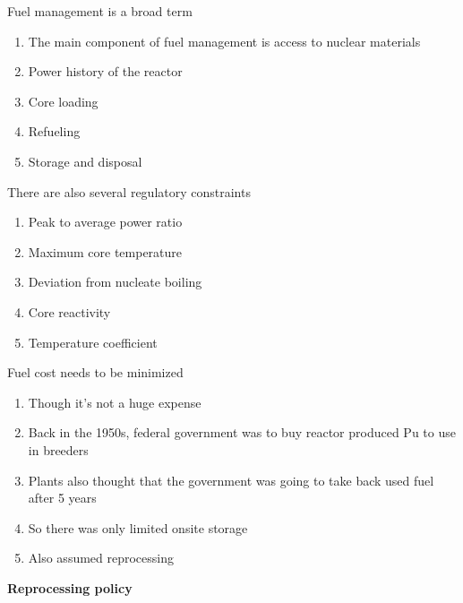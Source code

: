 \documentclass[aspectratio=1610,pdftex,dvipsnames,compress,xcolor={dvipsnames}]{beamer}
\begin{document}
\addtocounter{framenumber}{-1} 
\begin{frame}{Fuel management is a broad term}
    \begin{enumerate}[series=outerlist,topsep=0pt,itemsep=15pt,leftmargin=*,label=(\arabic*)]
        \item[]The main component of fuel management is access to nuclear materials
        \item[]Power history of the reactor
        \item[]Core loading
        \item[]Refueling
        \item[]Storage and disposal
    \end{enumerate}
\end{frame}


\begin{frame}{There are also several regulatory constraints}
    \begin{enumerate}[topsep=0pt,itemsep=21pt,leftmargin=*,label=(\arabic*)]
        \item[]Peak to average power ratio
        \item[]Maximum core temperature
        \item[]Deviation from nucleate boiling
        \item[]Core reactivity
        \item[]Temperature coefficient 
    \end{enumerate}
\end{frame}


\begin{frame}{Fuel cost needs to be minimized}
    \begin{enumerate}[series=outerlist,topsep=0pt,itemsep=21pt,leftmargin=*,label=(\arabic*)]
        \item[]Though it's not a huge expense
        \item[]Back in the 1950s, federal government was to buy reactor produced Pu to use in breeders
        \item[]Plants also thought that the government was going to take back used fuel after 5 years
        \item[]So there was only limited onsite storage
        \item[]Also assumed reprocessing
    \end{enumerate}
\end{frame}


\begin{frame}[plain]{}
    \centering\LARGE\textbf{Reprocessing policy}
\end{frame}
\end{document}
